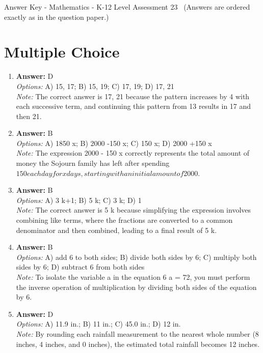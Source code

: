 \documentclass[12pt]{article}
\begin{document}
\begin{center}
Answer Key - Mathematics - K-12 Level Assessment 23 \
\small (Answers are ordered exactly as in the question paper.)
\end{center}

\section*{Multiple Choice}
\begin{enumerate}[label=\arabic*.]
\item \textbf{Answer:} D
\\ \textit{Options:} A) 15, 17; B) 15, 19; C) 17, 19; D) 17, 21
\\ \textit{Note:} The correct answer is 17, 21 because the pattern increases by 4 with each successive term, and continuing this pattern from 13 results in 17 and then 21.
\item \textbf{Answer:} B
\\ \textit{Options:} A) 1850 x; B) 2000 -150 x; C) 150 x; D) 2000 +150 x
\\ \textit{Note:} The expression 2000 - 150 x correctly represents the total amount of money the Sojourn family has left after spending $150 each day for x days, starting with an initial amount of $2000.
\item \textbf{Answer:} B
\\ \textit{Options:} A) 3 k+1; B) 5 k; C) 3 k; D) 1
\\ \textit{Note:} The correct answer is 5 k because simplifying the expression involves combining like terms, where the fractions are converted to a common denominator and then combined, leading to a final result of 5 k.
\item \textbf{Answer:} B
\\ \textit{Options:} A) add 6 to both sides; B) divide both sides by 6; C) multiply both sides by 6; D) subtract 6 from both sides
\\ \textit{Note:} To isolate the variable a in the equation 6 a = 72, you must perform the inverse operation of multiplication by dividing both sides of the equation by 6.
\item \textbf{Answer:} D
\\ \textit{Options:} A) 11.9 in.; B) 11 in.; C) 45.0 in.; D) 12 in.
\\ \textit{Note:} By rounding each rainfall measurement to the nearest whole number (8 inches, 4 inches, and 0 inches), the estimated total rainfall becomes 12 inches.
\end{enumerate}
\end{document}
